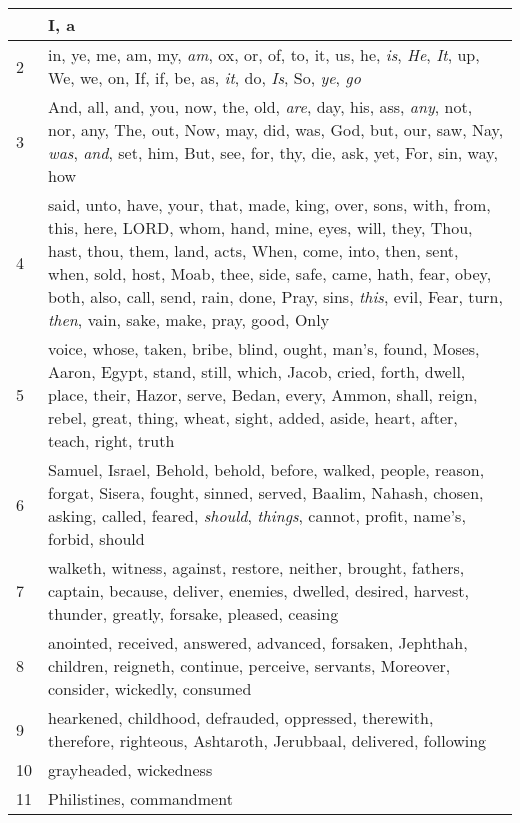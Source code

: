 \begin{longtable}{l|p{3.75in}}
\hline \hline
\endlastfoot
1 & I, a \\ \hline
2 & in, ye, me, am, my, \emph{am}, ox, or, of, to, it, us, he, \emph{is}, \emph{He}, \emph{It}, up, We, we, on, If, if, be, as, \emph{it}, do, \emph{Is}, So, \emph{ye}, \emph{go} \\ \hline
3 & And, all, and, you, now, the, old, \emph{are}, day, his, ass, \emph{any}, not, nor, any, The, out, Now, may, did, was, God, but, our, saw, Nay, \emph{was}, \emph{and}, set, him, But, see, for, thy, die, ask, yet, For, sin, way, how \\ \hline
4 & said, unto, have, your, that, made, king, over, sons, with, from, this, here, LORD, whom, hand, mine, eyes, will, they, Thou, hast, thou, them, land, acts, When, come, into, then, sent, when, sold, host, Moab, thee, side, safe, came, hath, fear, obey, both, also, call, send, rain, done, Pray, sins, \emph{this}, evil, Fear, turn, \emph{then}, vain, sake, make, pray, good, Only \\ \hline
5 & voice, whose, taken, bribe, blind, ought, man's, found, Moses, Aaron, Egypt, stand, still, which, Jacob, cried, forth, dwell, place, their, Hazor, serve, Bedan, every, Ammon, shall, reign, rebel, great, thing, wheat, sight, added, aside, heart, after, teach, right, truth \\ \hline
6 & Samuel, Israel, Behold, behold, before, walked, people, reason, forgat, Sisera, fought, sinned, served, Baalim, Nahash, chosen, asking, called, feared, \emph{should}, \emph{things}, cannot, profit, name's, forbid, should \\ \hline
7 & walketh, witness, against, restore, neither, brought, fathers, captain, because, deliver, enemies, dwelled, desired, harvest, thunder, greatly, forsake, pleased, ceasing \\ \hline
8 & anointed, received, answered, advanced, forsaken, Jephthah, children, reigneth, continue, perceive, servants, Moreover, consider, wickedly, consumed \\ \hline
9 & hearkened, childhood, defrauded, oppressed, therewith, therefore, righteous, Ashtaroth, Jerubbaal, delivered, following \\ \hline
10 & grayheaded, wickedness \\ \hline
11 & Philistines, commandment \\ \hline
\end{longtable}






